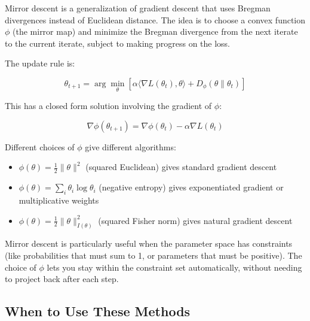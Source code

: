 Mirror descent is a generalization of gradient descent that uses Bregman divergences instead of Euclidean distance. The idea is to choose a convex function $\phi$ (the mirror map) and minimize the Bregman divergence from the next iterate to the current iterate, subject to making progress on the loss.

The update rule is:

\begin{equation}
\theta_{t+1} = \arg\min_\theta \left[\alpha \langle \nabla L(\theta_t), \theta \rangle + D_\phi(\theta \| \theta_t)\right]
\end{equation}

This has a closed form solution involving the gradient of $\phi$:

\begin{equation}
\nabla \phi(\theta_{t+1}) = \nabla \phi(\theta_t) - \alpha \nabla L(\theta_t)
\end{equation}

\vspace{1em}

Different choices of $\phi$ give different algorithms:

\begin{itemize}
\item $\phi(\theta) = \frac{1}{2}\|\theta\|^2$ (squared Euclidean) gives standard gradient descent

\item $\phi(\theta) = \sum_i \theta_i \log \theta_i$ (negative entropy) gives exponentiated gradient or multiplicative weights

\item $\phi(\theta) = \frac{1}{2}\|\theta\|^2_{I(\theta)}$ (squared Fisher norm) gives natural gradient descent
\end{itemize}

\vspace{1em}

Mirror descent is particularly useful when the parameter space has constraints (like probabilities that must sum to 1, or parameters that must be positive). The choice of $\phi$ lets you stay within the constraint set automatically, without needing to project back after each step.

\vspace{1.5em}

\subsection{When to Use These Methods}

